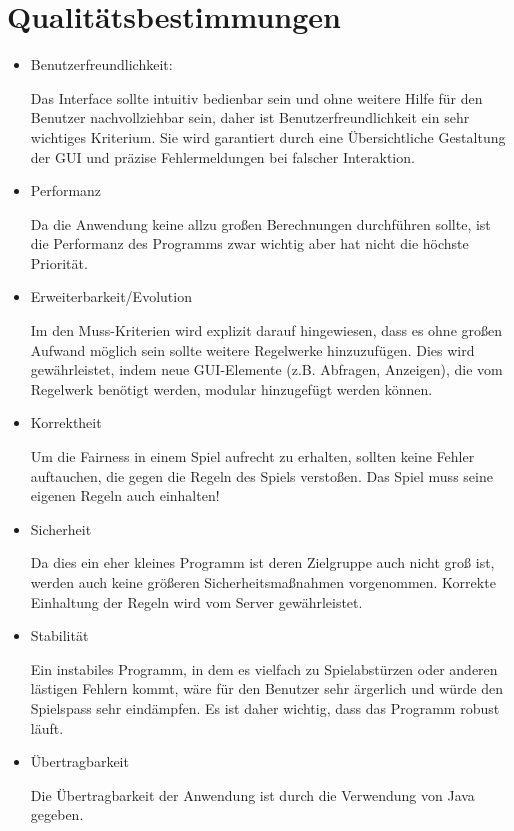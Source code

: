 \documentclass{article}
\begin{document}
\section{Qualitätsbestimmungen}

\begin{itemize}
\item Benutzerfreundlichkeit:

Das Interface sollte intuitiv bedienbar sein und ohne weitere Hilfe für den Benutzer nachvollziehbar sein, daher ist Benutzerfreundlichkeit ein sehr wichtiges Kriterium. Sie wird garantiert durch eine Übersichtliche Gestaltung der GUI und präzise Fehlermeldungen bei falscher Interaktion. 

\item Performanz

Da die Anwendung keine allzu großen Berechnungen durchführen sollte, ist die Performanz des Programms zwar wichtig aber hat nicht die höchste Priorität.

\item Erweiterbarkeit/Evolution

Im den Muss-Kriterien wird explizit darauf hingewiesen, dass es ohne großen Aufwand möglich sein sollte weitere Regelwerke hinzuzufügen. Dies wird gewährleistet, indem neue GUI-Elemente (z.B. Abfragen, Anzeigen), die vom Regelwerk benötigt werden, modular hinzugefügt werden können.

\item Korrektheit

Um die Fairness in einem Spiel aufrecht zu erhalten, sollten keine Fehler auftauchen, die gegen die Regeln des Spiels verstoßen. Das Spiel muss seine eigenen Regeln auch einhalten!

\item Sicherheit

Da dies ein eher kleines Programm ist deren Zielgruppe auch nicht groß ist, werden auch keine größeren Sicherheitsmaßnahmen vorgenommen. Korrekte Einhaltung der Regeln wird vom Server gewährleistet.

\item Stabilität

Ein instabiles Programm, in dem es vielfach zu Spielabstürzen oder anderen lästigen Fehlern kommt, wäre für den Benutzer sehr ärgerlich und würde den Spielspass sehr eindämpfen. Es ist daher wichtig, dass das Programm robust läuft.

\item Übertragbarkeit

Die Übertragbarkeit der Anwendung ist durch die Verwendung von Java gegeben.

\end{itemize}
\newpage
\printglossaries
\end{document}
